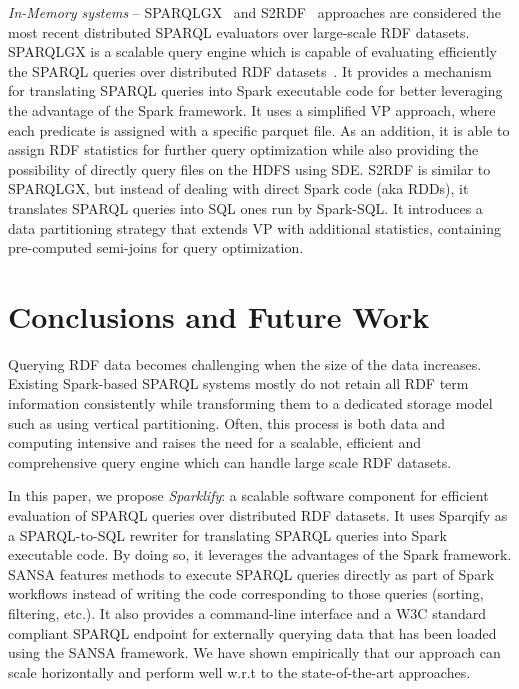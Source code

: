 \textit{In-Memory systems} --
SPARQLGX~\cite{sparqlgx-iswc-2016} and S2RDF~\cite{Schatzle:2016:SRQ:2977797.2977806} approaches are considered the most recent distributed SPARQL evaluators over large-scale RDF datasets.
SPARQLGX is a scalable query engine which is capable of evaluating efficiently the SPARQL queries over distributed RDF datasets~\cite{graux2018multi}.
It provides a mechanism for translating SPARQL queries into Spark executable code for better leveraging the advantage of the Spark framework.
It uses a simplified VP approach, where each predicate is assigned with a specific parquet file. 
As an addition, it is able to assign RDF statistics for further query optimization while also providing the possibility of directly query files on the HDFS using SDE.
S2RDF is similar to SPARQLGX, but instead of dealing with direct Spark code (aka RDDs), it translates SPARQL queries into SQL ones run by Spark-SQL. 
It introduces a data partitioning strategy that extends VP with additional statistics, containing pre-computed semi-joins for query optimization.


\section{Conclusions and Future Work}
\label{sec:conclusion}
Querying RDF data becomes challenging when the size of the data increases.
Existing Spark-based SPARQL systems mostly
do not retain all RDF term information consistently while transforming them to a dedicated storage model such as using vertical partitioning.
Often, this process is both data and computing intensive and raises the need for a scalable, efficient and comprehensive query engine which can handle large scale RDF datasets.

In this paper, we propose \emph{Sparklify}: a scalable software component for efficient evaluation of SPARQL queries over distributed RDF datasets. 
It uses Sparqify as a SPARQL-to-SQL rewriter for translating SPARQL queries into Spark executable code.
By doing so, it leverages the advantages of the Spark framework.
SANSA features methods to execute SPARQL queries directly as part of Spark workflows instead of writing the code corresponding to those queries (sorting, filtering, etc.).
It also provides a command-line interface and a W3C standard compliant SPARQL endpoint for externally querying data that has been loaded using the SANSA framework.
We have shown empirically that our approach can scale horizontally and perform well w.r.t to the state-of-the-art approaches.


